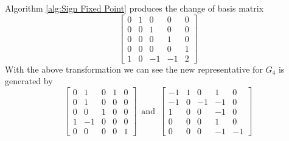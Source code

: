 \documentclass{article}
\theoremstyle{plain}
\theoremstyle{definition}
\newcommand{\tand}{\ensuremath{\,\,\, \text{and} \,\,\,}}
\begin{document}
%
Algorithm \ref{alg:Sign Fixed Point} produces the change of basis matrix 
$$
 \left[ \begin {array}{ccccc} 0&1&0&0&0\\ 0&0&1&0&0
\\ 0&0&0&1&0\\ 0&0&0&0&1
\\ 1&0&-1&-1&2\end {array} \right] 
$$
With the above transformation we can see the new representative for $G_4$ is generated by 
$$
\left[ \begin {array}{cccc|c} 0&1&0&1&0\\0&1&0&0&0
\\0&0&1&0&0\\1&-1&0&0&0
\\\hline 0&0&0&0&1\end {array} \right] 
\tand
 \left[ \begin {array}{cccc|c} -1&1&0&1&0\\-1&0&-1&-
1&0\\1&0&0&-1&0\\0&0&0&1&0
\\ \hline0&0&0&-1&-1\end {array} \right] 
$$
\end{document}
